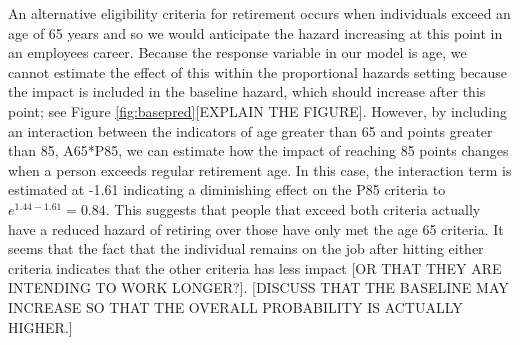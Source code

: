 \documentclass[12pt,letterpaper]{article}
\begin{document}
An alternative eligibility criteria for retirement occurs when individuals exceed an age of 65 years and so we would anticipate the hazard increasing at this point in an employees career.  Because the response variable in our model is age, we cannot estimate the effect of this within the proportional hazards setting because the impact is included in the baseline hazard, which should increase after this point; see Figure \ref{fig:basepred}[EXPLAIN THE FIGURE].  However, by including an interaction between the indicators of age greater than 65 and points greater than 85, A65*P85, we can estimate how the impact of reaching 85 points changes when a person exceeds regular retirement age.  In this case, the interaction term is estimated at -1.61 indicating a diminishing effect on the P85 criteria to $e^{1.44-1.61} =0.84$.  This suggests that people that exceed both criteria actually have a reduced hazard of retiring over those have only met the age 65 criteria.  It seems that the fact that the individual remains on the job after hitting either criteria indicates that the other criteria has less impact [OR THAT THEY ARE INTENDING TO WORK LONGER?].  [DISCUSS THAT THE BASELINE MAY INCREASE SO THAT THE OVERALL PROBABILITY IS ACTUALLY HIGHER.]
\end{document}
